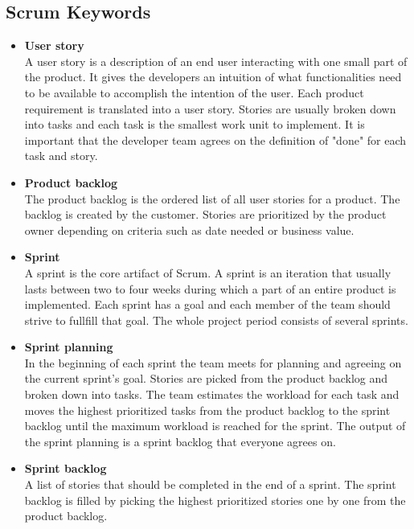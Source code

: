 \subsection{Scrum Keywords}
\begin{itemize}
\item{\textbf{User story}}\\
A user story is a description of an end user interacting with one small part
of the product. It gives the developers an intuition of what functionalities need to be available
to accomplish the intention of the user.
Each product requirement is translated into a user story. Stories are usually
broken down into tasks and each task is the smallest work unit to implement.
It is important that the developer team agrees on the definition of "done" for each task and story.

\item{\textbf{Product backlog}}\\
The product backlog is the ordered list of all user stories for a product. The backlog
is created by the customer.
Stories are prioritized by the product owner depending on criteria such as date needed or business value.

\item{\textbf{Sprint}}\\
A sprint is the core artifact of Scrum. A sprint is an iteration that usually lasts between two to four weeks
during which a part of an entire product is implemented. Each sprint has a goal and each member of
the team should strive to fullfill that goal. The whole project period consists of several sprints.

\item{\textbf{Sprint planning}}\\
In the beginning of each sprint the team meets for planning and agreeing on the current sprint's goal.
Stories are picked from the product backlog and broken down into tasks. The team estimates the workload
for each task and moves the highest prioritized tasks from the product backlog to the
sprint backlog until the maximum workload is reached for the sprint. The output of the sprint planning
is a sprint backlog that everyone agrees on. 

\item{\textbf{Sprint backlog}}\\
A list of stories that should be completed in the end of a sprint. The sprint backlog is filled by picking the highest 
prioritized stories one by one from the product backlog. 


\end{itemize}
